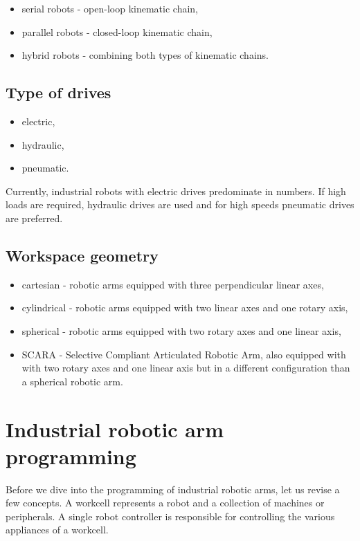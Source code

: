 \begin{itemize}
    \item serial robots - open-loop kinematic chain,
    \item parallel robots - closed-loop kinematic chain,
    \item hybrid robots - combining both types of kinematic chains.
\end{itemize}


\subsection*{Type of drives}

\begin{itemize}
    \item electric,
    \item hydraulic,
    \item pneumatic.
\end{itemize}

Currently, industrial robots with electric drives predominate in numbers. If high loads are required, hydraulic drives are used and for high speeds pneumatic drives are preferred.

\subsection*{Workspace geometry}

\begin{itemize}
    \item cartesian - robotic arms equipped with three perpendicular linear axes,
    \item cylindrical - robotic arms equipped with two linear axes and one rotary axis,
    \item spherical -  robotic arms equipped with two rotary axes and one linear axis,
    \item SCARA - Selective Compliant Articulated Robotic Arm, also equipped with with two rotary axes and one linear axis but in a different configuration than a spherical robotic arm.
\end{itemize}

\section{Industrial robotic arm programming}

Before we dive into the programming of industrial robotic arms, let us revise a few concepts.
A workcell represents a robot and a collection of machines or peripherals. A single robot controller is responsible for controlling the various appliances of a workcell.

